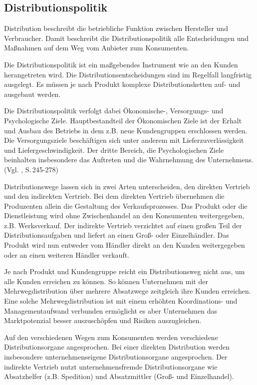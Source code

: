 \subsection{Distributionspolitik}
    Distribution beschreibt die betriebliche Funktion zwischen Hersteller und Verbraucher. Damit beschreibt die
    Distributionspolitik alle Entscheidungen und Maßnahmen auf dem Weg vom Anbieter zum Konsumenten.

    \noindent
    Die Distributionspolitik ist ein maßgebendes Instrument wie an den Kunden herangetreten wird. Die
    Distributionsentscheidungen sind im Regelfall langfristig ausgelegt. Es müssen je nach Produkt komplexe
    Distributionsketten auf- und ausgebaut werden.

    \noindent
    Die Distributionspolitik verfolgt dabei Ökonomische-, Versorgungs- und Psychologische Ziele. Hauptbestandteil der
    Ökonomischen Ziele ist der Erhalt und Ausbau des Betriebs in dem z.B. neue Kundengruppen erschlossen werden. Die
    Versorgungsziele beschäftigen sich unter anderem mit Lieferzuverlässigkeit und Liefergeschwindigkeit. Der dritte
    Bereich, die Psychologischen Ziele beinhalten insbesondere das Auftreten und die Wahrnehmung des Unternehmens.
    (Vgl. \cite{Bruhn2014}, S.\,245-278)

    \noindent
    Distributionswege lassen sich in zwei Arten unterscheiden, den direkten Vertrieb und den indirekten Vertrieb. Bei
    dem direkten Vertrieb übernehmen die Produzenten allein die Gestaltung des Verkaufsprozesses. Das Produkt oder die
    Dienstleistung wird ohne Zwischenhandel an den Konsumenten weitergegeben, z.B. Werksverkauf. Der indirekte Vertrieb
    verzichtet auf einen großen Teil der Distributionsaufgaben und liefert an einen Groß- oder Einzelhändler. Das
    Produkt wird nun entweder vom Händler direkt an den Kunden weitergegeben oder an einen weiteren Händler verkauft.

    \noindent
    Je nach Produkt und Kundengruppe reicht ein Distributionsweg nicht aus, um alle Kunden erreichen zu können. So
    können Unternehmen mit der Mehrwegdistribution über mehrere Absatzwege zeitgleich ihre Kunden erreichen. Eine solche
    Mehrwegdistribution ist mit einem erhöhten Koordinations- und Managementaufwand verbunden ermöglicht es aber
    Unternehmen das Marktpotenzial besser auszuschöpfen und Risiken auszugleichen.

    \noindent
    Auf den verschiedenen Wegen zum Konsumenten werden verschiedene Distributionsorgane angesprochen. Bei einer direkten
    Distribution werden insbesondere unternehmenseigene Distributionsorgane angesprochen. Der indirekte Vertrieb nutzt
    unternehmensfremde Distributionsorgane wie Absatzhelfer (z.B. Spedition) und Absatzmittler (Groß- und Einzelhandel).

